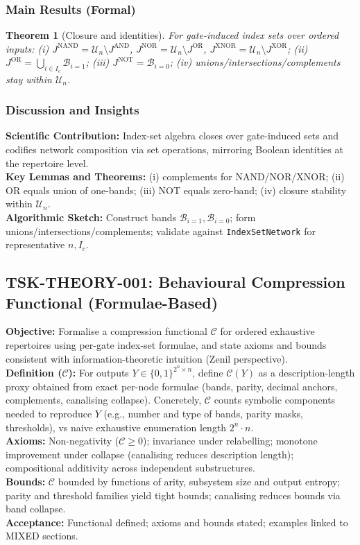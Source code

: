 \documentclass[11pt]{article}
\newtheorem{theorem}{Theorem}
\begin{document}
\subsubsection*{Main Results (Formal)}
\begin{theorem}[Closure and identities]
For gate-induced index sets over ordered inputs: (i) \(J^{\mathrm{NAND}}=\mathcal{U}_n\setminus J^{\mathrm{AND}}\), \(J^{\mathrm{NOR}}=\mathcal{U}_n\setminus J^{\mathrm{OR}}\), \(J^{\mathrm{XNOR}}=\mathcal{U}_n\setminus J^{\mathrm{XOR}}\); (ii) \(J^{\mathrm{OR}}=\bigcup_{i\in I_c}\mathcal{B}_{i=1}\); (iii) \(J^{\mathrm{NOT}}=\mathcal{B}_{i=0}\); (iv) unions/intersections/complements stay within \(\mathcal{U}_n\).
\end{theorem}
\subsubsection*{Discussion and Insights}
\textbf{Scientific Contribution:} Index-set algebra closes over gate-induced sets and codifies network composition via set operations, mirroring Boolean identities at the repertoire level.\\
\textbf{Key Lemmas and Theorems:} (i) complements for NAND/NOR/XNOR; (ii) OR equals union of one-bands; (iii) NOT equals zero-band; (iv) closure stability within \(\mathcal{U}_n\).\\
\textbf{Algorithmic Sketch:} Construct bands \(\mathcal{B}_{i=1}, \mathcal{B}_{i=0}\); form unions/intersections/complements; validate against \texttt{IndexSetNetwork} for representative \(n,I_c\).
\subsection{TSK-THEORY-001: Behavioural Compression Functional (Formulae-Based)}
\textbf{Objective:} Formalise a compression functional \(\mathcal{C}\) for ordered exhaustive repertoires using per-gate index-set formulae, and state axioms and bounds consistent with information-theoretic intuition (Zenil perspective).\\
\textbf{Definition (\(\mathcal{C}\)):} For outputs \(Y\in\{0,1\}^{2^n\times n}\), define \(\mathcal{C}(Y)\) as a description-length proxy obtained from exact per-node formulae (bands, parity, decimal anchors, complements, canalising collapse). Concretely, \(\mathcal{C}\) counts symbolic components needed to reproduce \(Y\) (e.g., number and type of bands, parity masks, thresholds), vs naive exhaustive enumeration length \(2^n\cdot n\).\\
\textbf{Axioms:} Non-negativity (\(\mathcal{C}\ge 0\)); invariance under relabelling; monotone improvement under collapse (canalising reduces description length); compositional additivity across independent substructures.\\
\textbf{Bounds:} \(\mathcal{C}\) bounded by functions of arity, subsystem size and output entropy; parity and threshold families yield tight bounds; canalising reduces bounds via band collapse.\\
\textbf{Acceptance:} Functional defined; axioms and bounds stated; examples linked to MIXED sections.\
\end{document}
